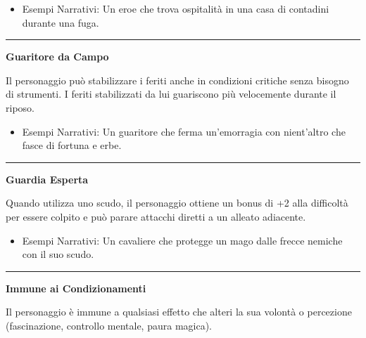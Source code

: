 \documentclass[../manuale_main.tex]{subfiles}
\begin{document}
\begin{itemize}
\item Esempi Narrativi: Un eroe che trova ospitalità in una casa di contadini durante una fuga.
\end{itemize}

\vspace{0.5cm}
\noindent
\begin{center}
\rule{\textwidth}{0.4pt} 
\end{center}
\vspace{0.5cm}

\begin{center}
\textbf{\large{Guaritore da Campo}}\\
\end{center}
Il personaggio può stabilizzare i feriti anche in condizioni critiche senza bisogno di strumenti. I feriti stabilizzati da lui guariscono più velocemente durante il riposo.

\begin{itemize}
\item Esempi Narrativi: Un guaritore che ferma un’emorragia con nient'altro che fasce di fortuna e erbe.
\end{itemize}

\vspace{0.5cm}
\noindent
\begin{center}
\rule{\textwidth}{0.4pt} 
\end{center}
\vspace{0.5cm}

\begin{center}
\textbf{\large{Guardia Esperta}}\\
\end{center}
Quando utilizza uno scudo, il personaggio ottiene un bonus di +2 alla difficoltà per essere colpito e può parare attacchi diretti a un alleato adiacente.

\begin{itemize}
\item Esempi Narrativi: Un cavaliere che protegge un mago dalle frecce nemiche con il suo scudo.
\end{itemize}

\vspace{0.5cm}
\noindent
\begin{center}
\rule{\textwidth}{0.4pt} 
\end{center}
\vspace{0.5cm}

\begin{center}
\textbf{\large{Immune ai Condizionamenti}}\\
\end{center}
Il personaggio è immune a qualsiasi effetto che alteri la sua volontà o percezione (fascinazione, controllo mentale, paura magica).
\end{document}
